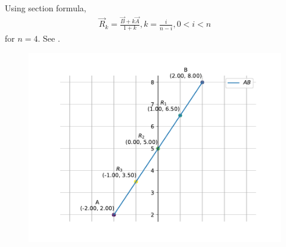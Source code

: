 Using section formula,
\begin{align}
	\vec{R}_k=\frac{\vec{B}+k\vec{A}}{1+k}, k = \frac{i}{n-i}, 0 < i < n
\end{align}
for $n = 4$.
See 
.
\begin{figure}[H]
\begin{center}
   \includegraphics[width=0.75\columnwidth]{chapters/10/7/2/9/figs/fig.pdf}
\end{center}
\caption{}
\label{fig:chapters/10/7/2/9/Fig}
\end{figure}

